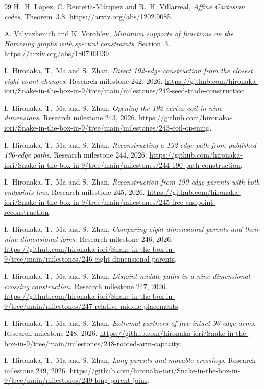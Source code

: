 \documentclass[11pt,a4paper]{article}
\theoremstyle{definition}
\theoremstyle{remark}
\begin{document}
\begin{thebibliography}{99}
H.~H. L\'opez, C. Renter\'ia-M\'arquez and R.~H. Villarreal,
\emph{Affine Cartesian codes}, Theorem~3.8.
\url{https://arxiv.org/abs/1202.0085}.

A. Valyuzhenich and K. Vorob'ev, \emph{Minimum supports of functions
on the Hamming graphs with spectral constraints}, Section~3.
\url{https://arxiv.org/abs/1807.09139}.

I.~Hironaka, T.~Ma and S.~Zhan, \emph{Direct 192-edge construction
from the closest eight-count changes}. Research milestone 242, 2026.
\url{https://github.com/hironaka-iori/Snake-in-the-box-in-9/tree/main/milestones/242-seed-trade-construction}.

I.~Hironaka, T.~Ma and S.~Zhan, \emph{Opening the 192-vertex coil
in nine dimensions}. Research milestone 243, 2026.
\url{https://github.com/hironaka-iori/Snake-in-the-box-in-9/tree/main/milestones/243-coil-opening}.

I.~Hironaka, T.~Ma and S.~Zhan, \emph{Reconstructing a 192-edge path
from published 190-edge paths}. Research milestone 244, 2026.
\url{https://github.com/hironaka-iori/Snake-in-the-box-in-9/tree/main/milestones/244-190-path-construction}.

I.~Hironaka, T.~Ma and S.~Zhan, \emph{Reconstruction from 190-edge
parents with both endpoints free}. Research milestone 245, 2026.
\url{https://github.com/hironaka-iori/Snake-in-the-box-in-9/tree/main/milestones/245-free-endpoint-reconstruction}.

I.~Hironaka, T.~Ma and S.~Zhan, \emph{Comparing eight-dimensional
parents and their nine-dimensional joins}. Research milestone 246, 2026.
\url{https://github.com/hironaka-iori/Snake-in-the-box-in-9/tree/main/milestones/246-eight-dimensional-parents}.

I.~Hironaka, T.~Ma and S.~Zhan, \emph{Disjoint middle paths in a
nine-dimensional crossing construction}. Research milestone 247, 2026.
\url{https://github.com/hironaka-iori/Snake-in-the-box-in-9/tree/main/milestones/247-relative-middle-placements}.

I.~Hironaka, T.~Ma and S.~Zhan, \emph{Extremal partners of five intact
96-edge arms}. Research milestone 248, 2026.
\url{https://github.com/hironaka-iori/Snake-in-the-box-in-9/tree/main/milestones/248-rooted-arm-capacity}.

I.~Hironaka, T.~Ma and S.~Zhan, \emph{Long parents and movable crossings}.
Research milestone 249, 2026.
\url{https://github.com/hironaka-iori/Snake-in-the-box-in-9/tree/main/milestones/249-long-parent-joins}.


\end{thebibliography}
\end{document}
